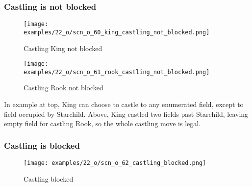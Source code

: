 \vspace*{-1.1\baselineskip}
\subsubsection*{Castling is not blocked}
\label{sec:One/Starchild/Starchild and castling/Castling is not blocked}

\vspace*{-1.3\baselineskip}
\noindent
\begin{figure}[!h]
\texttt{[image: examples/22\_o/scn\_o\_60\_king\_castling\_not\_blocked.png]}
\vspace*{-1.4\baselineskip}
\caption{Castling King not blocked}
\label{fig:scn_o_60_king_castling_not_blocked}
\end{figure}

\vspace*{-1.3\baselineskip}
\noindent
\begin{figure}[!h]
\texttt{[image: examples/22\_o/scn\_o\_61\_rook\_castling\_not\_blocked.png]}
\vspace*{-1.4\baselineskip}
\caption{Castling Rook not blocked}
\label{fig:scn_o_61_rook_castling_not_blocked}
\end{figure}

\vspace*{-0.4\baselineskip}
In example at top, King can choose to castle to any enumerated field, except
to field occupied by Starchild. Above, King castled two fields past Starchild,
leaving empty field for castling Rook, so the whole castling move is legal.


\vspace*{-1.1\baselineskip}
\subsubsection*{Castling is blocked}
\label{sec:One/Starchild/Starchild and castling/Castling is blocked}

\vspace*{-1.3\baselineskip}
\noindent
\begin{figure}[!h]
\texttt{[image: examples/22\_o/scn\_o\_62\_castling\_blocked.png]}
\vspace*{-1.4\baselineskip}
\caption{Castling blocked}
\label{fig:scn_o_62_castling_blocked}
\end{figure}

